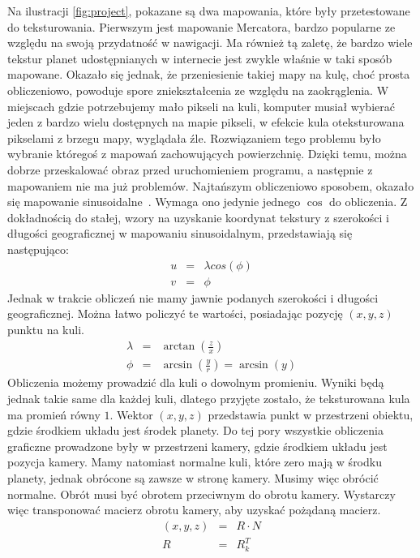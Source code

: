 Na ilustracji \hyperref[fig:project]{\ref{fig:project}}, pokazane są dwa mapowania, które były przetestowane do teksturowania. Pierwszym jest mapowanie Mercatora, bardzo popularne ze względu na swoją przydatność w nawigacji. Ma również tą zaletę, że bardzo wiele tekstur planet udostępnianych w internecie jest zwykle właśnie w taki sposób mapowane. Okazało się jednak, że przeniesienie takiej mapy na kulę, choć prosta obliczeniowo, powoduje spore zniekształcenia ze względu na zaokrąglenia. W miejscach gdzie potrzebujemy mało pikseli na kuli, komputer musiał wybierać jeden z bardzo wielu dostępnych na mapie pikseli, w efekcie kula oteksturowana pikselami z brzegu mapy, wyglądała źle. Rozwiązaniem tego problemu było wybranie któregoś z mapowań zachowujących powierzchnię. Dzięki temu, można dobrze przeskalować obraz przed uruchomieniem programu, a następnie z mapowaniem nie ma już problemów. Najtańszym obliczeniowo sposobem, okazało się mapowanie sinusoidalne~\cite{wiki:sinus}. Wymaga ono jedynie jednego $\cos$ do obliczenia. Z dokładnością do stałej, wzory na uzyskanie koordynat tekstury z szerokości i długości geograficznej w mapowaniu sinusoidalnym, przedstawiają się następująco:
\begin{eqnarray}
	u &=& \lambda cos(\phi) \\ \nonumber
	v &=& \phi
\end{eqnarray}
Jednak w trakcie obliczeń nie mamy jawnie podanych szerokości i długości geograficznej. Można łatwo policzyć te wartości, posiadając pozycję $(x,y,z)$ punktu na kuli.
\begin{eqnarray}\label{eq:texobj}
	\lambda &=& \arctan(\frac{z}{x}) \\ \nonumber
	\phi &=& \arcsin(\frac{y}{r}) = \arcsin(y) 
\end{eqnarray}
Obliczenia możemy prowadzić dla kuli o dowolnym promieniu. Wyniki będą jednak takie same dla każdej kuli, dlatego przyjęte zostało, że teksturowana kula ma promień równy $1$. Wektor $(x,y,z)$ przedstawia punkt w przestrzeni obiektu, gdzie środkiem układu jest środek planety. Do tej pory wszystkie obliczenia graficzne prowadzone były w przestrzeni kamery, gdzie środkiem układu jest pozycja kamery. Mamy natomiast normalne kuli, które zero mają w środku planety, jednak obrócone są zawsze w stronę kamery. Musimy więc obrócić normalne. Obrót musi być obrotem przeciwnym do obrotu kamery. Wystarczy więc transponować macierz obrotu kamery, aby uzyskać pożądaną macierz.
\begin{eqnarray}
(x,y,z) &=& R \cdot N \\ \nonumber
R &=& R_k^T
\end{eqnarray}
